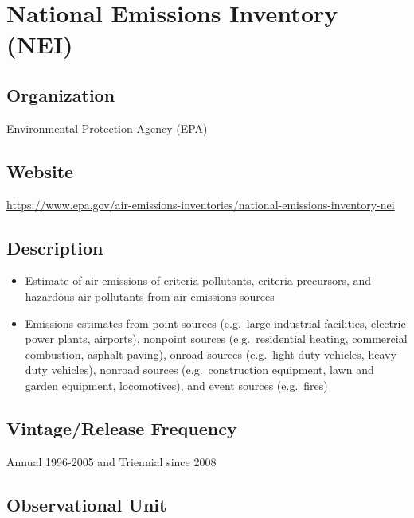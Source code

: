 \documentclass[
]{book}
\providecommand{\tightlist}{%
  \setlength{\itemsep}{0pt}\setlength{\parskip}{0pt}}
\begin{document}
\mainmatter

\hypertarget{national-emissions-inventory-nei}{%
\chapter{National Emissions Inventory (NEI)}\label{national-emissions-inventory-nei}}

\hypertarget{organization-46}{%
\section{Organization}\label{organization-46}}

Environmental Protection Agency (EPA)

\hypertarget{website-46}{%
\section{Website}\label{website-46}}

\url{https://www.epa.gov/air-emissions-inventories/national-emissions-inventory-nei}

\hypertarget{description-46}{%
\section{Description}\label{description-46}}

\begin{itemize}
\tightlist
\item
  Estimate of air emissions of criteria pollutants, criteria precursors, and hazardous air pollutants from air emissions sources
\item
  Emissions estimates from point sources (e.g.~large industrial facilities, electric power plants, airports), nonpoint sources (e.g.~residential heating, commercial combustion, asphalt paving), onroad sources (e.g.~light duty vehicles, heavy duty vehicles), nonroad sources (e.g.~construction equipment, lawn and garden equipment, locomotives), and event sources (e.g.~fires)
\end{itemize}

\hypertarget{vintagerelease-frequency-46}{%
\section{Vintage/Release Frequency}\label{vintagerelease-frequency-46}}

Annual 1996-2005 and Triennial since 2008

\hypertarget{observational-unit-46}{%
\section{Observational Unit}\label{observational-unit-46}}
\end{document}
